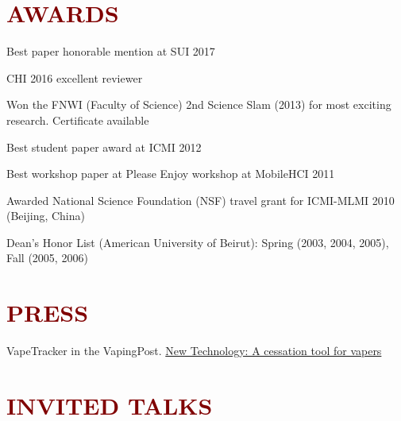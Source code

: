 \documentclass{article}
\newenvironment{innerlist}[1][\enskip\textbullet]%
        {\begin{compactenum}[#1]}{\end{compactenum}}
\begin{document}
\section*{\textcolor{maroon}{\normalsize AWARDS}} 

\begin{innerlist}[-]

\item Best paper honorable mention at SUI 2017

\item CHI 2016 excellent reviewer

\item Won the FNWI (Faculty of Science) 2nd Science Slam (2013) for most exciting research. Certificate available

\item Best student paper award at ICMI 2012

\item Best workshop paper at Please Enjoy workshop at MobileHCI 2011

\item Awarded National Science Foundation (NSF) travel grant for ICMI-MLMI 2010 (Beijing, China)

\item Dean's Honor List (American University of Beirut): Spring (2003, 2004, 2005), Fall (2005, 2006)

\end{innerlist}



\section*{\textcolor{maroon}{\normalsize PRESS}} 


\begin{innerlist}[-]

\item VapeTracker in the VapingPost. \href{http://www.vapingpost.com/2016/04/08/new-technology-a-cessation-tool-for-vapers/}{New Technology: A cessation tool for vapers}

\end{innerlist}


\section*{\textcolor{maroon}{\normalsize INVITED TALKS}} 
\end{document}
